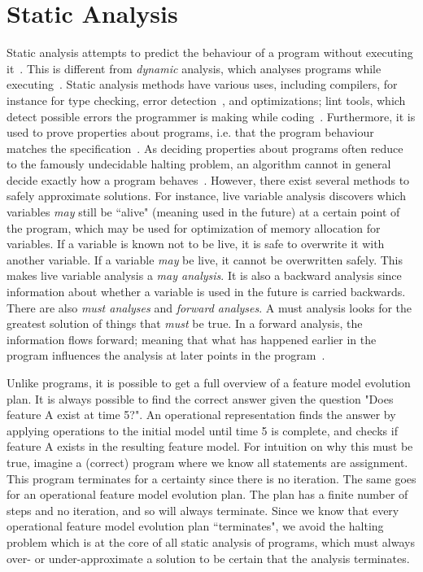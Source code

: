 \section{Static Analysis}
\label{sec:static-analysis}

Static analysis attempts to predict the behaviour of a program without executing it~\cite{book:principles-of-program-analysis}. This is different from \emph{dynamic} analysis, which analyses programs while executing~\cite{art:a-survey-on-static-analysis-and-model-checking}. Static analysis methods have various uses, including compilers, for instance for type checking, error detection~\cite{art:a-survey-on-automated-dynamic-malware-analysis-techniques-and-tools}, and optimizations; lint tools, which detect possible errors the programmer is making while coding~\cite{art:industrial-perspective-on-static-analysis}. Furthermore, it is used to prove properties about programs, i.e. that the program behaviour matches the specification~\cite{art:a-survey-on-static-analysis-and-model-checking}. As deciding properties about programs often reduce to the famously undecidable halting problem, an algorithm cannot in general decide exactly how a program behaves~\cite{book:principles-of-program-analysis}. However, there exist several methods to safely approximate solutions. For instance, live variable analysis discovers which variables \emph{may} still be ``alive" (meaning used in the future) at a certain point of the program, which may be used for optimization of memory allocation for variables. If a variable is known not to be live, it is safe to overwrite it with another variable. If a variable \emph{may} be live, it cannot be overwritten safely. This makes live variable analysis a \emph{may analysis}. It is also a backward analysis since information about whether a variable is used in the future is carried backwards. There are also \emph{must analyses} and \emph{forward analyses}. A must analysis looks for the greatest solution of things that \emph{must} be true. In a forward analysis, the information flows forward; meaning that what has happened earlier in the program influences the analysis at later points in the program~\cite{book:principles-of-program-analysis}.

Unlike programs, it is possible to get a full overview of a feature model evolution plan. It is always possible to find the correct answer given the question "Does feature A exist at time 5?". An operational representation finds the answer by applying operations to the initial model until time 5 is complete, and checks if feature A exists in the resulting feature model. For intuition on why this must be true, imagine a (correct) program where we know all statements are assignment. This program terminates for a certainty since there is no iteration. The same goes for an operational feature model evolution plan. The plan has a finite number of steps and no iteration, and so will always terminate. Since we know that every operational feature model evolution plan ``terminates", we avoid the halting problem which is at the core of all static analysis of programs, which must always over- or under-approximate a solution to be certain that the analysis terminates.

